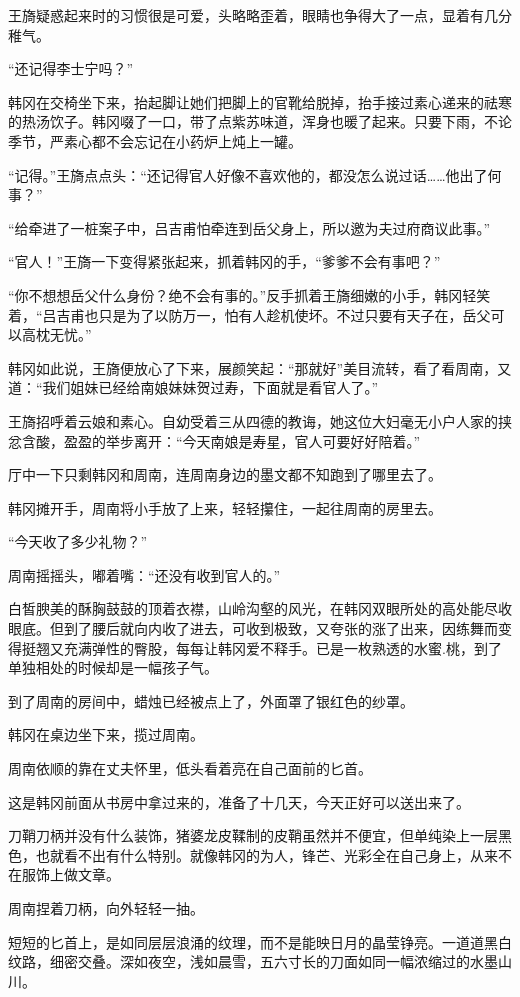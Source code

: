 王旖疑惑起来时的习惯很是可爱，头略略歪着，眼睛也争得大了一点，显着有几分稚气。

“还记得李士宁吗？”

韩冈在交椅坐下来，抬起脚让她们把脚上的官靴给脱掉，抬手接过素心递来的祛寒的热汤饮子。韩冈啜了一口，带了点紫苏味道，浑身也暖了起来。只要下雨，不论季节，严素心都不会忘记在小药炉上炖上一罐。

“记得。”王旖点点头：“还记得官人好像不喜欢他的，都没怎么说过话……他出了何事？”

“给牵进了一桩案子中，吕吉甫怕牵连到岳父身上，所以邀为夫过府商议此事。”

“官人！”王旖一下变得紧张起来，抓着韩冈的手，“爹爹不会有事吧？”

“你不想想岳父什么身份？绝不会有事的。”反手抓着王旖细嫩的小手，韩冈轻笑着，“吕吉甫也只是为了以防万一，怕有人趁机使坏。不过只要有天子在，岳父可以高枕无忧。”

韩冈如此说，王旖便放心了下来，展颜笑起：“那就好”美目流转，看了看周南，又道：“我们姐妹已经给南娘妹妹贺过寿，下面就是看官人了。”

王旖招呼着云娘和素心。自幼受着三从四德的教诲，她这位大妇毫无小户人家的挟忿含酸，盈盈的举步离开：“今天南娘是寿星，官人可要好好陪着。”

厅中一下只剩韩冈和周南，连周南身边的墨文都不知跑到了哪里去了。

韩冈摊开手，周南将小手放了上来，轻轻攥住，一起往周南的房里去。

“今天收了多少礼物？”

周南摇摇头，嘟着嘴：“还没有收到官人的。”

白皙腴美的酥胸鼓鼓的顶着衣襟，山岭沟壑的风光，在韩冈双眼所处的高处能尽收眼底。但到了腰后就向内收了进去，可收到极致，又夸张的涨了出来，因练舞而变得挺翘又充满弹性的臀股，每每让韩冈爱不释手。已是一枚熟透的水蜜.桃，到了单独相处的时候却是一幅孩子气。

到了周南的房间中，蜡烛已经被点上了，外面罩了银红色的纱罩。

韩冈在桌边坐下来，揽过周南。

周南依顺的靠在丈夫怀里，低头看着亮在自己面前的匕首。

这是韩冈前面从书房中拿过来的，准备了十几天，今天正好可以送出来了。

刀鞘刀柄并没有什么装饰，猪婆龙皮鞣制的皮鞘虽然并不便宜，但单纯染上一层黑色，也就看不出有什么特别。就像韩冈的为人，锋芒、光彩全在自己身上，从来不在服饰上做文章。

周南捏着刀柄，向外轻轻一抽。

短短的匕首上，是如同层层浪涌的纹理，而不是能映日月的晶莹铮亮。一道道黑白纹路，细密交叠。深如夜空，浅如晨雪，五六寸长的刀面如同一幅浓缩过的水墨山川。

